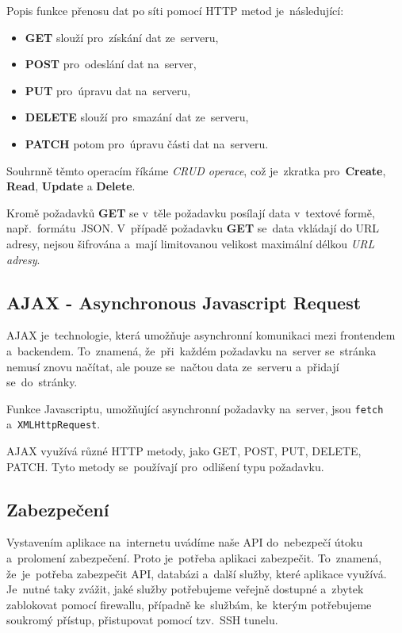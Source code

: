 \documentclass[14pt]{article}
\begin{document}
        Popis funkce přenosu dat po síti pomocí HTTP metod je~následující:
        \begin{itemize}
            \item \textbf{GET} slouží pro~získání dat ze~serveru,
            \item \textbf{POST} pro~odeslání dat na~server,
            \item \textbf{PUT} pro~úpravu dat na~serveru,
            \item \textbf{DELETE} slouží pro~smazání dat ze~serveru,
            \item \textbf{PATCH} potom pro~úpravu části dat na~serveru.
        \end{itemize}

        Souhrnně těmto operacím říkáme \emph{CRUD operace}, což je~zkratka pro~\textbf{Create}, \textbf{Read}, \textbf{Update} a \textbf{Delete}.

        Kromě požadavků \textbf{GET} se v~těle požadavku posílají data v~textové formě, např.~formátu~JSON. 
        V~případě požadavku \textbf{GET} se~data vkládají do URL adresy, nejsou šifrována a~mají limitovanou velikost maximální délkou \emph{URL adresy}.

        \subsection{AJAX - Asynchronous Javascript Request}
        AJAX je~technologie, která umožňuje asynchronní komunikaci mezi frontendem a~backendem.
        To~znamená, že~při~každém požadavku na~server se~stránka nemusí znovu načítat, ale pouze se~načtou data ze~serveru a~přidají se~do~stránky.

        Funkce Javascriptu, umožňující asynchronní požadavky na~server, jsou \texttt{fetch} a~\texttt{XMLHttpRequest}.

        AJAX využívá různé HTTP metody, jako GET, POST, PUT, DELETE, PATCH. Tyto metody se~používají pro~odlišení typu požadavku.

        \subsection{Zabezpečení}
        Vystavením aplikace na~internetu uvádíme naše API do~nebezpečí útoku a~prolomení zabezpečení. Proto je~potřeba aplikaci zabezpečit.
        To~znamená, že~je~potřeba zabezpečit API, databázi a~další služby, které aplikace využívá. Je~nutné taky zvážit,
        jaké služby potřebujeme veřejně dostupné a~zbytek zablokovat pomocí firewallu, případně ke~službám, ke~kterým potřebujeme soukromý přístup,
        přistupovat pomocí tzv.~SSH tunelu.
\end{document}
